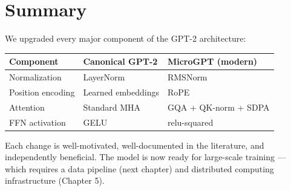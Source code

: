 

\section{Summary}

We upgraded every major component of the GPT-2 architecture:

\begin{center}
\begin{tabular}{lll}
\toprule
Component & Canonical GPT-2 & MicroGPT (modern) \\
\midrule
Normalization & LayerNorm & RMSNorm \\
Position encoding & Learned embeddings & RoPE \\
Attention & Standard MHA & GQA + QK-norm + SDPA \\
FFN activation & GELU & relu-squared \\
\bottomrule
\end{tabular}
\end{center}

Each change is well-motivated, well-documented in the literature, and independently beneficial.  The model is now ready for large-scale training --- which requires a data pipeline (next chapter) and distributed computing infrastructure (Chapter 5).
